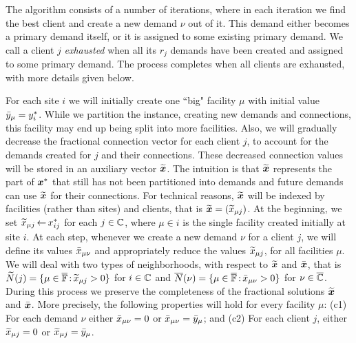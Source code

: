 \documentclass[11pt]{article}
\begin{document}
The algorithm consists of a number of iterations, where in
each iteration we find the best client and create a new demand
$\nu$ out of it. This demand either becomes a primary demand
itself, or it is assigned to some existing primary
demand. We call a client $j$ \emph{exhausted} when all its
$r_j$ demands have been created and assigned to some primary
demand. The process completes when all clients are
exhausted, with more details given below.

For each site $i$ we will initially create one ``big"
facility $\mu$ with initial value ${\bar y}_\mu = y^\ast_i$.
While we partition the instance, creating new demands and connections,
this facility may end up being split into more facilities. Also, 
we will gradually decrease the fractional connection vector for each client $j$, 
to account for the demands created for $j$ and their connections.
These decreased connection
values will be stored in an auxiliary vector $\widetilde{\boldsymbol{x}}$. The intuition
is that $\widetilde{\boldsymbol{x}}$ represents the part of $\boldsymbol{x}^\ast$ that
still has not been partitioned into demands and future
demands can use $\widetilde{\boldsymbol{x}}$ for their connections. For technical reasons,
$\widetilde{\boldsymbol{x}}$ will be indexed by facilities (rather than
sites) and clients, that is $\widetilde{\boldsymbol{x}} = ({\widetilde x}_{\mu j})$.
At the beginning, we set ${\widetilde x}_{\mu j}{\,\leftarrow\,}
x_{ij}^\ast$ for each $j\in\mathbb{C}$, where $\mu\in i$ is
the single facility created initially at site $i$.  At each
step, whenever we create a new demand $\nu$ for a client
$j$, we will define its values ${\bar x}_{\mu\nu}$ and
appropriately reduce the values ${\widetilde x}_{\mu j}$, for all 
facilities $\mu$. We will deal with
two types of neighborhoods, with respect to  $\widetilde{\boldsymbol{x}}$ and $\bar{\boldsymbol{x}}$,
that is
${\widetilde N}(j)=\{\mu\in\overline{\mathbb{F}} {\,:\,}{\widetilde x}_{\mu j} > 0\}$ for $i\in\mathbb{C}$
and ${\overline{N}}(\nu)=\{\mu\in\overline{\mathbb{F}} {\,:\,} {\bar x}_{\mu\nu} >0\}$ for $\nu\in\overline{\mathbb{C}}$.
During this process we preserve the completeness of the
fractional solutions $\widetilde{\boldsymbol{x}}$ and $\bar{\boldsymbol{x}}$. More precisely, the following
properties will hold for every facility $\mu$: 
(c1) For each demand $\nu$ either ${\bar x}_{\mu\nu}=0$ or
${\bar x}_{\mu\nu}={\bar y}_{\mu}$; and 
(c2) For each client $j$,
either ${\widetilde x}_{\mu j}=0$ or ${\widetilde x}_{\mu j}={\bar y}_{\mu}$.
\end{document}
